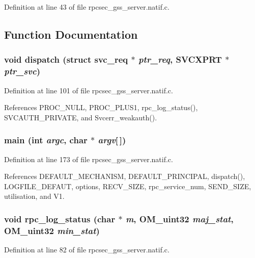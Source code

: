 Definition at line 43 of file rpcsec\_\-gss\_\-server.natif.c.

\subsection{Function Documentation}
\subsubsection{\setlength{\rightskip}{0pt plus 5cm}void dispatch (struct svc\_\-req $\ast$ {\em ptr\_\-req}, SVCXPRT $\ast$ {\em ptr\_\-svc})}\label{rpcsec__gss__server_8natif_8c_a17}




Definition at line 101 of file rpcsec\_\-gss\_\-server.natif.c.

References PROC\_\-NULL, PROC\_\-PLUS1, rpc\_\-log\_\-status(), SVCAUTH\_\-PRIVATE, and Svcerr\_\-weakauth().
\subsubsection{\setlength{\rightskip}{0pt plus 5cm}main (int {\em argc}, char $\ast$ {\em argv}[$\,$])}\label{rpcsec__gss__server_8natif_8c_a18}




Definition at line 173 of file rpcsec\_\-gss\_\-server.natif.c.

References DEFAULT\_\-MECHANISM, DEFAULT\_\-PRINCIPAL, dispatch(), LOGFILE\_\-DEFAUT, options, RECV\_\-SIZE, rpc\_\-service\_\-num, SEND\_\-SIZE, utilisation, and V1.
\subsubsection{\setlength{\rightskip}{0pt plus 5cm}void rpc\_\-log\_\-status (char $\ast$ {\em m}, OM\_\-uint32 {\em maj\_\-stat}, OM\_\-uint32 {\em min\_\-stat})}\label{rpcsec__gss__server_8natif_8c_a16}




Definition at line 82 of file rpcsec\_\-gss\_\-server.natif.c.

